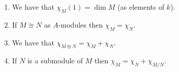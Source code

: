 \begin{lemma}
  \leavevmode
  \label{lemma: properties of general characters}
  \begin{enumerate}
    \item
      We have that $\chi_M(1) = \dim M$ (as elements of $k$).
    \item
      If $M \cong N$ as $A$-modules then $\chi_M = \chi_N$.
    \item
      \label{enumerate: character of direct sum}
      We have that $\chi_{M \oplus N} = \chi_M + \chi_N$.
    \item
      \label{enumerate: character of quotient}
      If $N$ is a submodule of $M$ then $\chi_M = \chi_N + \chi_{M/N}$.
  \end{enumerate}
\end{lemma}
